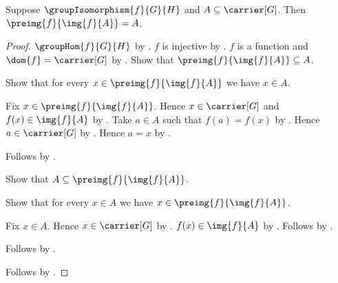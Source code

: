 \begin{theorem}\label{group_isomorphism_preimage_image}
    Suppose $\groupIsomorphism{f}{G}{H}$ and
        $A\subseteq\carrier[G]$.
    Then $\preimg{f}{\img{f}{A}}=A$.
\end{theorem}
\begin{proof}
    $\groupHom{f}{G}{H}$ by
        .
    $f$ is injective by
        .
    $f$ is a function and $\dom{f}=\carrier[G]$ by
        .
    Show that $\preimg{f}{\img{f}{A}}\subseteq A$.
    \begin{subproof}
        Show that for every $x\in\preimg{f}{\img{f}{A}}$ we have
            $x\in A$.
        \begin{subproof}
            Fix $x\in\preimg{f}{\img{f}{A}}$.
            Hence $x\in\carrier[G]$ and
                $f(x)\in\img{f}{A}$ by
                .
            Take $a\in A$ such that $f(a)=f(x)$ by
                .
            Hence $a\in\carrier[G]$ by .
            Hence $a=x$ by .
        \end{subproof}
        Follows by .
    \end{subproof}
    Show that $A\subseteq\preimg{f}{\img{f}{A}}$.
    \begin{subproof}
        Show that for every $x\in A$ we have
            $x\in\preimg{f}{\img{f}{A}}$.
        \begin{subproof}
            Fix $x\in A$.
            Hence $x\in\carrier[G]$ by .
            $f(x)\in\img{f}{A}$ by
                .
            Follows by .
        \end{subproof}
        Follows by .
    \end{subproof}
    Follows by .
\end{proof}

